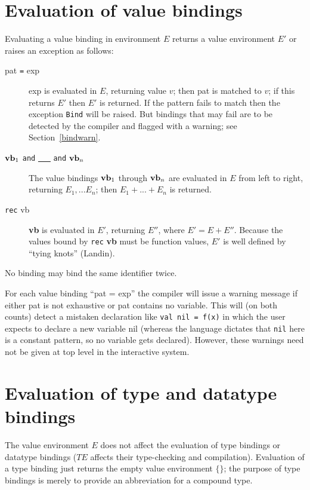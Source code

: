 \section{Evaluation of value bindings}
Evaluating a value binding in environment $E$ returns a value
environment $E'$  or raises an exception as follows:
\begin{description}
\item[pat \verb"=" exp\hfill]  exp is evaluated in $E$, returning value
$v$; then pat is matched to $v$; if this returns $E'$ then $E'$ is
returned.  If the pattern fails to match then the exception 
\verb"Bind" will be raised.
\label{raisebind}
But bindings that may fail are to be detected by the
compiler and flagged with a warning; see Section~\ref{bindwarn}.

\item[${\bf vb}_1$ \verb"and" \underline{\ \ \ } \verb"and" ${\bf vb}_n$\hfill]
The value bindings ${\bf vb}_1$ through ${\bf vb}_n$ are evaluated in
$E$ from left to right, returning $E_1 , ... E_n$; then $E_1 + ... +
E_n$ is returned.

\item[\verb"rec" vb\hfill]  {\bf vb} is evaluated in $E'$, returning $E''$,
where $E' = E + E''$.  Because the values bound by \verb"rec" {\bf
vb} must be function values, $E'$ is well defined by ``tying knots''
(Landin).
\end{description}
No binding may bind the same identifier twice.

\label{bindwarn}
For each value binding ``pat = exp'' the compiler will issue a
warning message if {\rm either} pat is not exhaustive {\rm or} pat
contains no variable.  This will (on both counts) detect a mistaken
declaration like \verb"val nil = f(x)" in which the user expects to
declare a new variable nil (whereas the language dictates that
\verb"nil" here is a constant pattern, so no variable gets declared).
However, these warnings need not be given at top level in the
interactive system.
\section{Evaluation of type and datatype bindings}
The value environment $E$ does not affect the evaluation of type
bindings or datatype bindings ($TE$ affects their type-checking and
compilation).  Evaluation of a type binding just returns the empty
value environment $\{\}$; the purpose of type bindings is merely to
provide an abbreviation for a compound type.

